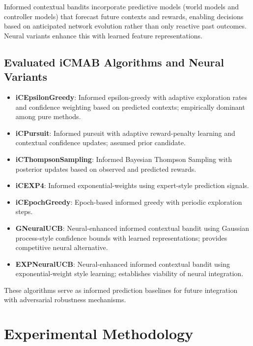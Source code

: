 \documentclass[12pt,a4paper]{article}
\begin{document}
Informed contextual bandits incorporate predictive models (world models and controller models) that forecast future contexts and rewards, enabling decisions based on anticipated network evolution rather than only reactive past outcomes. Neural variants enhance this with learned feature representations.

\subsection{Evaluated iCMAB Algorithms and Neural Variants}
\begin{itemize}
\item \textbf{iCEpsilonGreedy}: Informed epsilon-greedy with adaptive exploration rates and confidence weighting based on predicted contexts; empirically dominant among pure methods.
\item \textbf{iCPursuit}: Informed pursuit with adaptive reward-penalty learning and contextual confidence updates; assumed prior candidate.
\item \textbf{iCThompsonSampling}: Informed Bayesian Thompson Sampling with posterior updates based on observed and predicted rewards.
\item \textbf{iCEXP4}: Informed exponential-weights using expert-style prediction signals.
\item \textbf{iCEpochGreedy}: Epoch-based informed greedy with periodic exploration steps.
\item \textbf{GNeuralUCB}: Neural-enhanced informed contextual bandit using Gaussian process-style confidence bounds with learned representations; provides competitive neural alternative.
\item \textbf{EXPNeuralUCB}: Neural-enhanced informed contextual bandit using exponential-weight style learning; establishes viability of neural integration.
\end{itemize}

These algorithms serve as informed prediction baselines for future integration with adversarial robustness mechanisms.

\section{Experimental Methodology}
\end{document}
